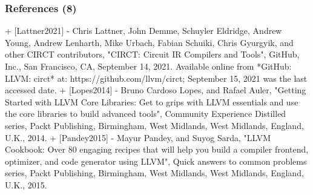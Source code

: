 \documentclass[xcolor={usenames,dvipsnames},hyperref={hyperindex,bookmarks}]{beamer}
\begin{document}
\begin{frame}
	\frametitle{References (8)}

+ [Lattner2021]
	- Chris Lattner, John Demme, Schuyler Eldridge, Andrew Young, Andrew Lenharth, Mike Urbach, Fabian Schuiki, Chris Gyurgyik, and {other CIRCT contributors}, "CIRCT: Circuit {IR} Compilers and Tools", {GitHub, Inc.}, San Francisco, {CA}, September 14, 2021. Available online from *{GitHub}: {LLVM}: circt* at: https://github.com/llvm/circt; September 15, 2021 was the last accessed date.
+ [Lopes2014]
	- Bruno Cardoso Lopes, and Rafael Auler, "Getting Started with {LLVM} Core Libraries: Get to grips with {LLVM} essentials and use the core libraries to build advanced tools", Community Experience Distilled series, Packt Publishing, Birmingham, West Midlands, West Midlands, England, {U.K.}, 2014.
+ [Pandey2015]
	- Mayur Pandey, and Suyog Sarda, "{LLVM} Cookbook: Over 80 engaging recipes that will help you build a compiler frontend, optimizer, and code generator using {LLVM}", Quick answers to common problems series, Packt Publishing, Birmingham, West Midlands, West Midlands, England, {U.K.}, 2015.


\end{frame}
\end{document}
